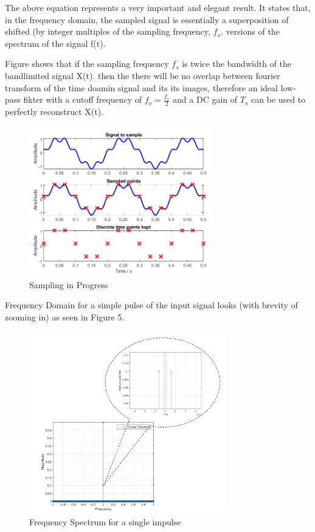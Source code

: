 \documentclass{article}
\begin{document}
The above equation represents a very important and elegant result. It states that, in the frequency domain, the sampled signal is essentially a superposition of shifted  (by integer multiples of the sampling frequency, $f_s$. versions of the spectrum of the signal f(t). 

Figure shows that if the sampling frequency $f_s$ is twice the bandwidth of the bandlimited signal X(t). then the there will be no overlap between fourier transform of the time doamin signal and its its images, therefore an ideal low-pass fikter with a cutoff frequency of $f_o = \frac{f_s}{2}$ and a DC gain of $T_s$ can be used to perfectly reconstruct X(t). 

\begin{figure}[htbp]
    \begin{center}
	\includegraphics[width=80mm]{figures/Sampling_in_process.PNG}
    \end{center}
    \caption{Sampling in Progress}
\end{figure}

Frequency Domain for a simple pulse of the input signal looks (with brevity of zooming in) as seen in Figure 5. 

\begin{figure}[htbp]
    \begin{center}
	\includegraphics[width=85mm]{figures/Main_f.png}
    \end{center}
    \caption{Frequency Spectrum for a single impulse}
\end{figure}
\end{document}
